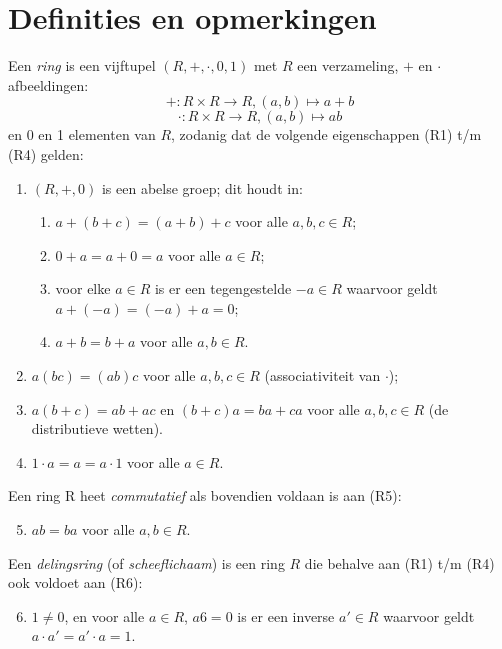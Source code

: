 \documentclass[a4paper,12pt,oneside]{book}
\begin{document}
\section{Definities en opmerkingen}
\begin{definitie} Een \textit{ring} is een vijftupel $(R, +, \cdot , 0, 1)$ met $R$ een verzameling, $+$ en $\cdot$ afbeeldingen:
$$+ : R \times R \to R, (a, b) \mapsto a + b$$
$$\cdot  : R \times R \to R, (a, b) \mapsto ab $$
en 0 en 1 elementen van $R$, zodanig dat de volgende eigenschappen (R1) t/m (R4) gelden:
\begin{enumerate}[label=(R\arabic*)]
\item $(R, +, 0)$ is een abelse groep; dit houdt in:
\begin{enumerate}[label=(G\arabic*)]
\item $a + (b + c) = (a + b) + c$ voor alle $a, b, c \in R$;
\item $0 + a = a + 0 = a$ voor alle $a \in R$;
\item voor elke $a \in R$ is er een tegengestelde $-a \in R$ waarvoor geldt $a + (-a) = (-a) + a = 0$;
\item $a + b = b + a$ voor alle $a, b \in R$.
\end{enumerate}
\item $a(bc) = (ab)c$ voor alle $a, b, c \in R$ (associativiteit van $\cdot$);
\item $a(b + c) = ab + ac$ en $(b + c)a = ba + ca$ voor alle $a, b, c \in R$ (de distributieve wetten).
\item $1 \cdot a = a = a \cdot 1$ voor alle $a \in R$.
\end{enumerate}
\end{definitie}

\begin{definitie}
Een ring R heet \textit{commutatief} als bovendien voldaan is aan (R5):
\begin{enumerate}[label=(R\arabic*)]
\setcounter{enumi}{4}
\item $ab = ba$ voor alle $a, b \in R$.
\end{enumerate}
\end{definitie}

\begin{definitie}
Een \textit{delingsring} (of \textit{scheeflichaam}) is een ring $R$ die behalve aan (R1) t/m (R4) ook voldoet
aan (R6):
\begin{enumerate}[label=(R\arabic*)]
\setcounter{enumi}{5}
\item $1 \ne 0$, en voor alle $a \in R$, $a 6 = 0$ is er een inverse $a' \in R$ waarvoor geldt $a \cdot a' = a' \cdot a = 1$.
\end{enumerate}
\end{definitie}
\end{document}
